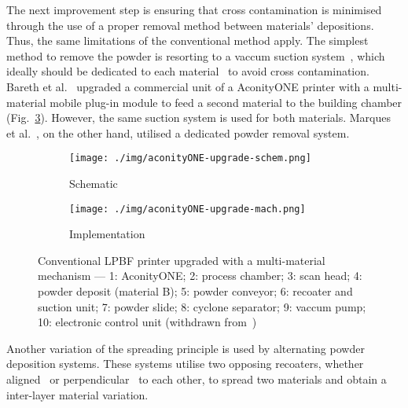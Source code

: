 The next improvement step is ensuring that cross contamination is minimised
through the use of a proper removal method between materials' depositions. Thus,
the same limitations of the conventional method apply.
The simplest method to remove the powder is resorting to a vaccum
suction system~\cite{schneck2022capability}, which ideally should be dedicated
to each material~\cite{bartolomeu2020additive} to avoid cross contamination. Bareth et al.~\cite{bareth2022Implem} upgraded
a commercial unit of a AconityONE printer with a multi-material mobile plug-in
module to feed a second material to the building chamber (Fig.~\ref{fig:aconityONE-upgrade}). However, the same
suction system is used for both materials. Marques
et al.~\cite{marques2022RocketEngine}, on the other hand, utilised a dedicated
powder removal system.

\begin{figure}[htbp!]
  \centering
  \begin{subfigure}[t]{0.44\textwidth}
  \centering
  \texttt{[image: ./img/aconityONE-upgrade-schem.png]}
  \caption{Schematic}%
  \label{fig:aconityONE-upgrade-schem}
  \end{subfigure}
%
  \begin{subfigure}[t]{0.54\textwidth}
  \centering
  \texttt{[image: ./img/aconityONE-upgrade-mach.png]}
  \caption{Implementation}%
  \label{fig:aconityONE-upgrade-mach}
\end{subfigure}
%
  \caption[Conventional LPBF printer upgraded with a multi-material
  mechanism]{Conventional LPBF printer upgraded with a multi-material mechanism --- 1: AconityONE; 2: process chamber; 3: scan head;
    4: powder deposit (material B); 5: powder conveyor; 6: recoater and suction
    unit; 7: powder slide; 8: cyclone separator; 9: vaccum pump; 10: electronic
    control unit
    (withdrawn from~\cite{bareth2022Implem})\footnotemark}%
  \label{fig:aconityONE-upgrade}
\end{figure}

%

Another variation of the spreading principle is used by
alternating powder deposition systems. These systems utilise two opposing
recoaters, whether aligned~\cite{wang2020formation} or perpendicular~\cite{goll2019additive} to each other, to spread two materials and obtain
a inter-layer material variation.

